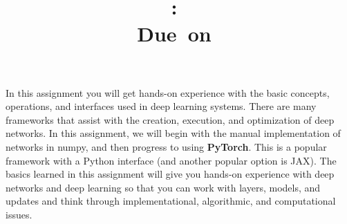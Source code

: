 \documentclass{article}
\title{
\textmd{\textbf{\hmwkClass:\ \hmwkTitle}}\\
\normalsize\vspace{0.1in}\small{Due\ on\ \hmwkDueDate}\\
}
\date{} %
\begin{document}
\maketitle

\vspace{-0.2in}
In this assignment you will get hands-on experience with the basic concepts, operations, and interfaces used in deep learning systems.
There are many frameworks that assist with the creation, execution, and optimization of deep networks.
In this assignment, we will begin with the manual implementation of networks in numpy, and then progress to using {\bf PyTorch}.
This is a popular framework with a Python interface (and another popular option is JAX).
The basics learned in this assignment will give you hands-on experience with deep networks and deep learning so that you can work with layers, models, and updates and think through implementational, algorithmic, and computational issues.

\end{document}
